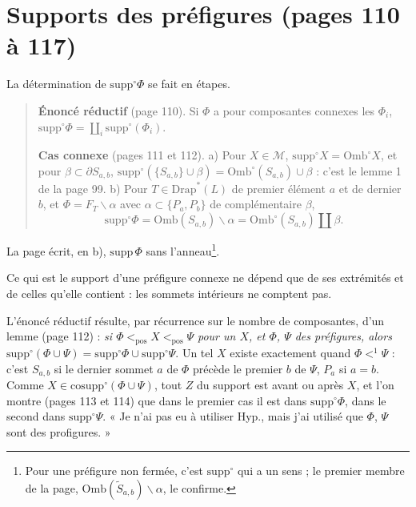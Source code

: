 \documentclass[11pt,a4paper]{article}
\begin{document}
\section*{Supports des préfigures (pages 110 à 117)}

La détermination de $\mathrm{supp}^{\circ}\Phi$ se fait en étapes.

\begin{quote}
\textbf{Énoncé réductif} (page 110). Si $\Phi$ a pour composantes connexes les
$\Phi_{i}$, $\mathrm{supp}^{\circ}\Phi = \coprod_{i}
\mathrm{supp}^{\circ}(\Phi_{i})$.

\textbf{Cas connexe} (pages 111 et 112). a) Pour $X \in \mathcal{M}$,
$\mathrm{supp}^{\circ}X = \mathrm{Omb}^{\circ}X$, et pour $\beta \subset
\partial S_{a,b}$, $\mathrm{supp}^{\circ}(\{S_{a,b}\} \cup \beta) =
\mathrm{Omb}^{\circ}(S_{a,b}) \cup \beta$ : c'est le lemme 1 de la page 99. b)
Pour $T \in \mathrm{Drap}^{*}(L)$ de premier élément $a$ et de dernier $b$, et
$\Phi = F_{T} \smallsetminus \alpha$ avec $\alpha \subset \{P_{a}, P_{b}\}$ de
complémentaire $\beta$,
\[
\mathrm{supp}^{\circ}\Phi = \mathrm{Omb}(S_{a,b}) \smallsetminus \alpha =
\mathrm{Omb}^{\circ}(S_{a,b}) \amalg \beta .
\]
\end{quote}
La page écrit, en b), $\mathrm{supp}\, \Phi$ sans l'anneau\footnote{Pour une
préfigure non fermée, c'est $\mathrm{supp}^{\circ}$ qui a un sens ; le premier
membre de la page, $\mathrm{Omb}(\widetilde{S}_{a,b}) \smallsetminus \alpha$,
le confirme.}.

Ce qui est le support d'une préfigure connexe ne dépend que de ses extrémités
et de celles qu'elle contient : les sommets intérieurs ne comptent pas.

L'énoncé réductif résulte, par récurrence sur le nombre de composantes, d'un
lemme (page 112) : \emph{si $\Phi <_{\mathrm{pos}} X <_{\mathrm{pos}} \Psi$
pour un $X$, et $\Phi$, $\Psi$ des préfigures, alors $\mathrm{supp}^{\circ}(\Phi
\cup \Psi) = \mathrm{supp}^{\circ}\Phi \cup \mathrm{supp}^{\circ}\Psi$}. Un tel
$X$ existe exactement quand $\Phi <^{1} \Psi$ : c'est $S_{a,b}$ si le dernier
sommet $a$ de $\Phi$ précède le premier $b$ de $\Psi$, $P_{a}$ si $a = b$. Comme
$X \in \mathrm{cosupp}^{\circ}(\Phi \cup \Psi)$, tout $Z$ du support est avant
ou après $X$, et l'on montre (pages 113 et 114) que dans le premier cas il est
dans $\mathrm{supp}^{\circ}\Phi$, dans le second dans
$\mathrm{supp}^{\circ}\Psi$. « Je n'ai pas eu à utiliser Hyp., mais j'ai utilisé
que $\Phi$, $\Psi$ sont des profigures. »
\end{document}
